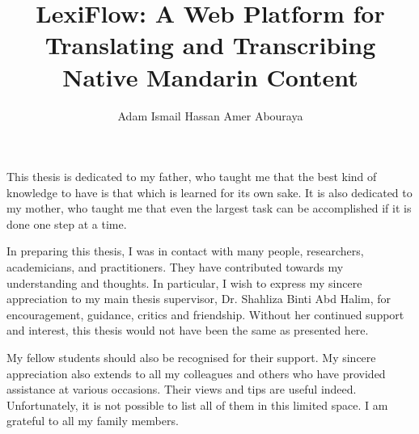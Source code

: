 \documentclass[oneside]{utmthesis}
\title{LexiFlow: A Web Platform for Translating and Transcribing Native Mandarin Content}
\author{Adam Ismail Hassan Amer Abouraya}
\begin{document}
\coverpage
\superpage

\certification

\frontmatter
\maketitle
\declaration

\normalsize

\begin{dedication}
    This thesis is dedicated to my father, who taught me that the best kind of knowledge to have is that which is learned for its own sake. It is also dedicated to my mother, who taught me that even the largest task can be accomplished if it is done one step at a time.\
\end{dedication}

\begin{acknowledgement}
    In preparing this thesis, I was in contact with many people, researchers, academicians, and practitioners. They have contributed towards my understanding and thoughts. In particular, I wish to express my sincere appreciation to my main thesis supervisor, Dr. Shahliza Binti Abd Halim, for encouragement, guidance, critics and friendship. Without her continued support and interest, this thesis would not have been the same as presented here.

    My fellow students should also be recognised for their support. My sincere appreciation also extends to all my colleagues and others who have provided assistance at various occasions. Their views and tips are useful indeed. Unfortunately, it is not possible to list all of them in this limited space. I am grateful to all my family members.
\end{acknowledgement}
\end{document}
